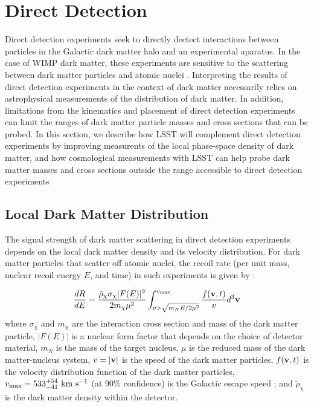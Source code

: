 \section{Direct Detection }
\label{sec:direct}

Direct detection experiments seek to directly dectect interactions between particles in the Galactic dark matter halo and an experimental aparatus. In the case of WIMP dark matter, these experiments are sensitive to the scattering between dark matter particles and atomic nuclei \citep[\eg,][]{1509.08767}.
Interpreting the results of direct detection experiments in the context of dark matter necessarily relies on astrophysical measurements of the distribution of dark matter.
In addition, limitations from the kinematics and placement of direct detection experiments can limit the ranges of dark matter particle masses and cross sections that can be probed.
In this section, we describe how LSST will complement direct detection experiments by improving measurents of the local phase-space density of dark matter, and how cosmological measurements with LSST can help probe dark matter  masses and cross sections outside the range accessible to direct detection experiments


\subsection{Local Dark Matter Distribution }

\def\rhodm{\rho_\mathrm{\chi}}
\def\rhodmlab{\tilde{\rho}_\mathrm{\chi}}
\def\rhodmext{\rho_\mathrm{\chi,ext}}

The signal strength of dark matter scattering in direct detection experiments depends on the local dark matter density and its velocity distribution. 
For dark matter particles that scatter off atomic nuclei, the recoil rate (per unit mass, nuclear recoil energy $E$, and time) in such experiments is given by \citep[\eg,][]{1996APh.....6...87L}: 

\begin{equation}
\frac{dR}{dE} = \frac{\rhodmlab \sigma_\chi |F(E)|^2}{2 m_\chi \mu^2} \int_{v>\sqrt{m_N E/2\mu^2}}^{v_\mathrm{max}} \frac{f({\bf v},t)}{v}d^3 {\bf v} 
\label{eqn:recoilrate} 
\end{equation} 
where $\sigma_\chi$ and $m_\chi$ are the interaction cross section and mass of the dark matter particle, $|F(E)|$ is a nuclear form factor that depends on the choice of detector material, $m_N$ is the mass of the target nucleus, $\mu$ is the reduced mass of the dark matter-nucleus system, $v = |{\bf v}|$ is the speed of the dark matter particles, $f({\bf v},t)$ is the velocity distribution function of the dark matter particles, $v_\mathrm{max} = 533^{+54}_{-41}\mathrm{\,\mathrm{\,km}\,\mathrm{\,s}^{-1}}$ (at 90\% confidence) is the Galactic escape speed \citep{2014AA...562A..91P}; and $\rhodmlab$ is the dark matter density within the detector. 
 
